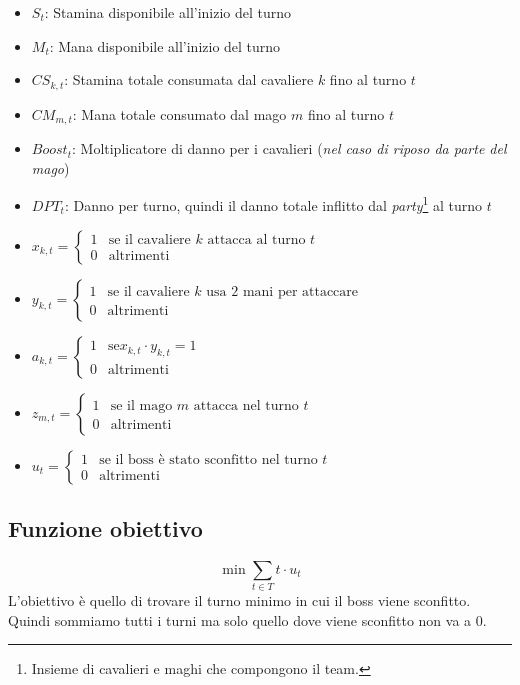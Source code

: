 \documentclass[12pt]{article}
\begin{document}
   \begin{itemize}
    \item $S_t$: Stamina disponibile all'inizio del turno
    \item $M_t$: Mana disponibile all'inizio del turno
    \item $CS_{k,t}$: Stamina totale consumata dal cavaliere $k$ fino al turno $t$
    \item $CM_{m,t}$: Mana totale consumato dal mago $m$ fino al turno $t$
    \item $Boost_t$: Moltiplicatore di danno per i cavalieri (\textit{nel caso di riposo da parte del mago})
    \item $DPT_t$: Danno per turno, quindi il danno totale inflitto dal \textit{party}\footnote{Insieme di cavalieri e maghi che compongono il team.} al turno $t$
    \item $x_{k,t} = \begin{cases} 
        1 & \text{se il cavaliere } k \text{ attacca al turno } t \\ 
        0 & \text{altrimenti} 
    \end{cases}$
    \item $y_{k,t} = \begin{cases} 
        1 & \text{se il cavaliere } k \text{ usa 2 mani per attaccare } \\ 
        0 & \text{altrimenti} 
    \end{cases}$
    \item $a_{k,t} = \begin{cases} 
        1 & \text{se} x_{k,t} \cdot y_{k,t}  = 1\\
        0 & \text{altrimenti}
    \end{cases}$
    \item $z_{m,t} = \begin{cases} 
        1 & \text{se il mago } m \text{ attacca nel turno } t \\ 
        0 & \text{altrimenti} 
    \end{cases}$
    \item $u_t = \begin{cases}
        1 & \text{se il boss è stato sconfitto nel turno } t \\
        0 & \text{altrimenti}
    \end{cases}$
    \end{itemize}
   \subsection{Funzione obiettivo}
    \begin{equation}
        \min \sum_{t \in T} t \cdot u_t
    \end{equation}
    L'obiettivo è quello di trovare il turno minimo in cui il boss viene sconfitto. Quindi sommiamo tutti i turni ma solo quello dove viene sconfitto non va a 0.\\
\end{document}
